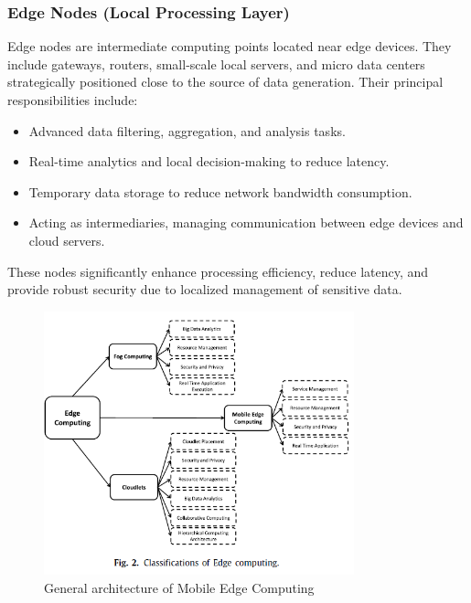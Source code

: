 \documentclass[runningheads]{llncs}
\begin{document}
\subsubsection{Edge Nodes (Local Processing Layer)}
Edge nodes are intermediate computing points located near edge devices. They include gateways, routers, small-scale local servers, and micro data centers strategically positioned close to the source of data generation. Their principal responsibilities include:
\begin{itemize}
    \item Advanced data filtering, aggregation, and analysis tasks.
    \item Real-time analytics and local decision-making to reduce latency.
    \item Temporary data storage to reduce network bandwidth consumption.
    \item Acting as intermediaries, managing communication between edge devices and cloud servers.
\end{itemize}

These nodes significantly enhance processing efficiency, reduce latency, and provide robust security due to localized management of sensitive data.

\begin{figure}[ht]
    \centering
    \includegraphics[width=0.8\textwidth]{IMG/1.png}
    \caption{General architecture of Mobile Edge Computing}
    \label{fig:mec_architecture}
    \end{figure}
\end{document}
